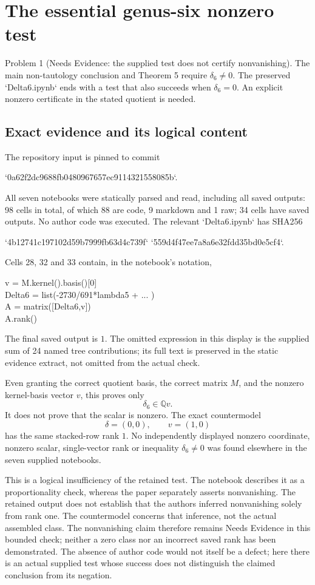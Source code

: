 \documentclass[10pt]{article}
\begin{document}
\section*{The essential genus-six nonzero test}
Problem 1 (Needs Evidence: the supplied test does not certify nonvanishing).  The main non-tautology conclusion and Theorem 5 require \(\delta_6\ne0\). The preserved `Delta6.ipynb` ends with a test that also succeeds when \(\delta_6=0\). An explicit nonzero certificate in the stated quotient is needed.\par
\subsection*{Exact evidence and its logical content}
The repository input is pinned to commit\par
`0a62f2dc9688fb0480967657ec9114321558085b`.\par
All seven notebooks were statically parsed and read, including all saved outputs: 98 cells in total, of which 88 are code, 9 markdown and 1 raw; 34 cells have saved outputs. No author code was executed. The relevant `Delta6.ipynb` has SHA256\par
`4b12741c197102d59b7999fb63d4c739f`
`559d4f47ee7a8a6e32fdd35bd0e5cf4`.\par
Cells 28, 32 and 33 contain, in the notebook’s notation,\par
{\ttfamily\footnotesize v = M.kernel().basis()[0]\\
Delta6 = list(-2730/691*lambda5 + ... )\\
A = matrix([Delta6,v])\\
A.rank()}\par
The final saved output is \(1\). The omitted expression in this display is the supplied sum of 24 named tree contributions; its full text is preserved in the static evidence extract, not omitted from the actual check.\par
Even granting the correct quotient basis, the correct matrix \(M\), and the nonzero kernel-basis vector \(v\), this proves only \[\delta_6\in\mathbb Qv.\] It does not prove that the scalar is nonzero. The exact countermodel \[\delta=(0,0),\qquad v=(1,0)\] has the same stacked-row rank \(1\). No independently displayed nonzero coordinate, nonzero scalar, single-vector rank or inequality \(\delta_6\ne0\) was found elsewhere in the seven supplied notebooks.\par
This is a logical insufficiency of the retained test. The notebook describes it as a proportionality check, whereas the paper separately asserts nonvanishing. The retained output does not establish that the authors inferred nonvanishing solely from rank one. The countermodel concerns that inference, not the actual assembled class. The nonvanishing claim therefore remains Needs Evidence in this bounded check; neither a zero class nor an incorrect saved rank has been demonstrated. The absence of author code would not itself be a defect; here there is an actual supplied test whose success does not distinguish the claimed conclusion from its negation.\par
\end{document}
